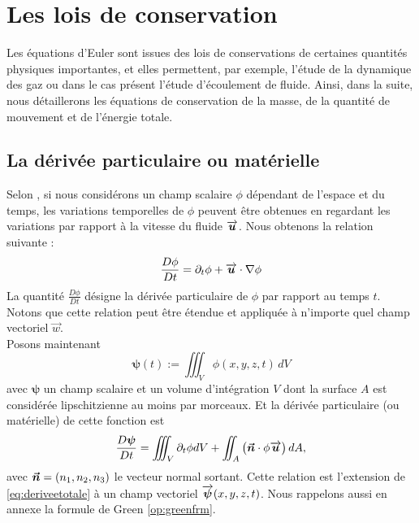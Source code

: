 \section{Les lois de conservation}
Les équations d'Euler sont issues des lois de conservations de certaines quantités physiques importantes, et elles permettent, par exemple, l'étude de la dynamique des gaz ou dans le cas présent l'étude d'écoulement de fluide. Ainsi, dans la suite, nous détaillerons les équations de conservation de la masse, de la quantité de mouvement et de l'énergie totale.\\
\subsection{La dérivée particulaire ou matérielle}
\noindent Selon \citep{toro_riemann_2009}, si nous considérons un champ scalaire $\phi$ dépendant de l'espace et du temps, les variations temporelles de $\phi$ peuvent être obtenues en regardant les variations par rapport à la vitesse du fluide $\overrightarrow{\boldsymbol{u}}$. Nous obtenons la relation suivante :
\begin{equation}
	\frac{D\phi}{Dt} =  \partial_t \phi + \overrightarrow{\boldsymbol{u}} \cdot \nabla \phi \label{eq:deriveetotale}
\end{equation}
La quantité $\frac{D \phi}{D t}$ désigne la dérivée particulaire de $\phi$ par rapport au temps $t$. Notons que cette relation peut être étendue et appliquée à n'importe quel champ vectoriel $\vec{w}$.\\
Posons maintenant 
\begin{equation}
	\boldsymbol{\psi} (t) := \iiint_V \phi (x, y, z, t)\,d V \label{eq:volumeintegration}
\end{equation}
avec $\boldsymbol{\psi}$ un champ scalaire et un volume d'intégration $V$ dont la surface $A$ est considérée lipschitzienne au moins par morceaux. Et la dérivée particulaire (ou matérielle) de cette fonction est 
\begin{equation}
	\frac{D \boldsymbol{\psi}}{D t} = \iiint_V \partial_t \phi d V + \iint_A \left(\boldsymbol{\vec{n}}\cdot\phi\overrightarrow{\boldsymbol{u}}\right)d A, \label{eq:psiinte}
\end{equation}
avec $\boldsymbol{\vec{n}} = (n_1, n_2, n_3)$ le vecteur normal sortant. Cette relation est l'extension de \eqref{eq:deriveetotale} à un champ vectoriel $\overrightarrow{\boldsymbol{\psi}} (x, y, z, t)$. Nous rappelons aussi en annexe la formule de Green \eqref{op:greenfrm}.


